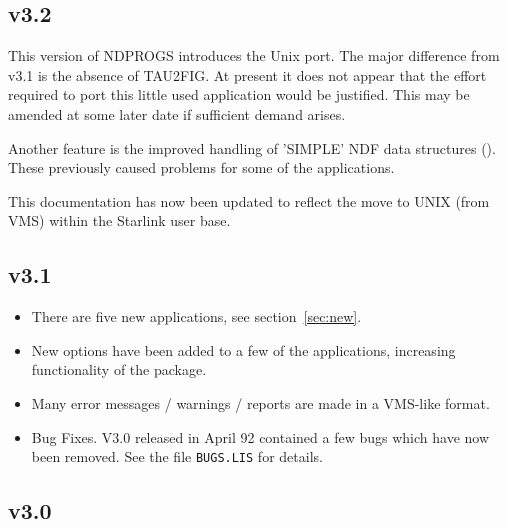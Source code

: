 \subsection{v3.2}

This version of NDPROGS introduces the Unix port. The major difference
from v3.1 is the absence of TAU2FIG. At present it does not appear that
the effort required to port this little used application would be
justified. This may be amended at some later date if sufficient demand
arises.

Another feature is the improved handling of 'SIMPLE' NDF data
structures (). These previously caused problems for some of the
applications.

This documentation has now been updated to reflect the move to 
UNIX (from VMS) within the Starlink user base.

\subsection{v3.1}

\begin{itemize}

\item There are five new applications, see section~\ref{sec:new}. 

\item New options have been added to a few of the applications,
increasing functionality of the package.

\item Many error messages / warnings / reports are made in a VMS-like
format.

\item Bug Fixes. V3.0 released in April 92 contained a few bugs which
have now been removed. See the file {\tt BUGS.LIS} for details.

\end {itemize}
 
\subsection{v3.0}

